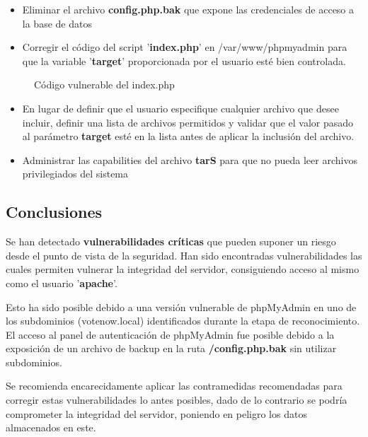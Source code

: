 \documentclass[a4paper]{article}
\begin{document}
\begin{itemize}
  \item Eliminar el archivo \textbf{config.php.bak} que expone las credenciales de acceso a la base de datos
  \item Corregir el código del script '\textbf{index.php}' en \//var\//www\//phpmyadmin para que la variable '\textbf{target}' proporcionada por
  el usuario esté bien controlada.
\end{itemize}

\vspace{0.4cm}

\begin{figure}[H]
  \centering
  \setlength{\fboxrule}{0.8pt}
  \caption{Código vulnerable del index.php}
\end{figure}

\begin{itemize}
  \item En lugar de definir que el usuario especifique cualquier archivo que desee
  incluir, definir una lista de archivos permitidos y validar que el valor pasado al
  parámetro \textbf{target} esté en la lista antes de aplicar la inclusión del archivo.
  \item Administrar las capabilities del archivo \textbf{tarS} para que no pueda leer
  archivos privilegiados del sistema
\end{itemize}

\clearpage

\subsection{Conclusiones}
Se han detectado \textbf{vulnerabilidades críticas} que pueden suponer un riesgo
desde el punto de vista de la seguridad. Han sido encontradas vulnerabilidades las cuales
permiten vulnerar la integridad del servidor, consiguiendo acceso al mismo como el usuario
'\textbf{apache}'.

Esto ha sido posible debido a una versión vulnerable de phpMyAdmin en uno de los subdominios
(votenow.local) identificados durante la etapa de reconocimiento.
El acceso al panel de autenticación de phpMyAdmin fue posible debido a la exposición de un archivo de
backup en la ruta \textbf{/config.php.bak} sin utilizar subdominios.

Se recomienda encarecidamente aplicar las contramedidas recomendadas para corregir estas
vulnerabilidades lo antes posibles, dado de lo contrario se podría comprometer la integridad
del servidor, poniendo en peligro los datos almacenados en este.
\end{document}
